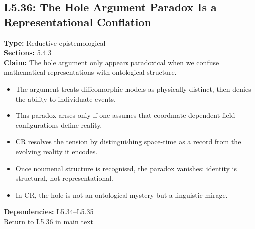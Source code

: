 \documentclass[12pt]{book}
\newcommand{\returnlink}[1]{\hyperref[logic:#1]{Return to #1 in main text}\xspace}
\begin{document}
\subsection*{L5.36: The Hole Argument Paradox Is a Representational Conflation}
\label{appendix:L5.36}
\textbf{Type:} Reductive-epistemological \\
\textbf{Sections:} 5.4.3 \\
\textbf{Claim:} The hole argument only appears paradoxical when we confuse mathematical representations with ontological structure.
\begin{itemize}
  \item The argument treats diffeomorphic models as physically distinct, then denies the ability to individuate events.
  \item This paradox arises only if one assumes that coordinate-dependent field configurations define reality.
  \item CR resolves the tension by distinguishing space-time as a record from the evolving reality it encodes.
  \item Once noumenal structure is recognised, the paradox vanishes: identity is structural, not representational.
  \item In CR, the hole is not an ontological mystery but a linguistic mirage.
\end{itemize}
\textbf{Dependencies:} L5.34–L5.35 \\
\returnlink{L5.36}
\end{document}
